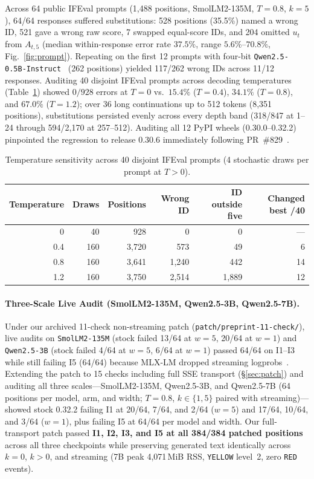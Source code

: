 \documentclass[11pt,letterpaper]{article}
\begin{document}
Across 64 public IFEval prompts (1,488 positions, SmolLM2-135M, $T=0.8$, $k=5$), 64/64 responses suffered substitutions: 528 positions (35.5\%) named a wrong ID, 521 gave a wrong raw score, 7 swapped equal-score IDs, and 204 omitted $u_t$ from $A_{t,5}$ (median within-response error rate $37.5\%$, range $5.6\%$--$70.8\%$, Fig.~\ref{fig:prompt}). Repeating on the first 12 prompts with four-bit \texttt{Qwen2.5-0.5B-Instruct}~\cite{qwen} (262 positions) yielded 117/262 wrong IDs across 11/12 responses. Auditing 40 disjoint IFEval prompts across decoding temperatures (Table~\ref{tab:temperature}) showed $0/928$ errors at $T=0$ vs.\ $15.4\%$ ($T=0.4$), $34.1\%$ ($T=0.8$), and $67.0\%$ ($T=1.2$); over 36 long continuations up to 512 tokens (8,351 positions), substitutions persisted evenly across every depth band (318/847 at 1--24 through 594/2,170 at 257--512). Auditing all 12 PyPI wheels (0.30.0--0.32.2) pinpointed the regression to release 0.30.6 immediately following PR~\#829~\cite{change}.

\begin{table}[t]
\centering
\caption{Temperature sensitivity across 40 disjoint IFEval prompts (4 stochastic draws per prompt at $T>0$).}
\label{tab:temperature}
\footnotesize
\begin{tabular}{@{}rrrrrr@{}}\toprule
Temperature & Draws & Positions & Wrong ID & ID outside five & Changed best /40\\\midrule
0 & 40 & 928 & 0 & 0 & ---\\
0.4 & 160 & 3,720 & 573 & 49 & 6\\
0.8 & 160 & 3,641 & 1,240 & 442 & 14\\
1.2 & 160 & 3,750 & 2,514 & 1,889 & 12\\\bottomrule
\end{tabular}
\end{table}

\paragraph{Three-Scale Live Audit (SmolLM2-135M, Qwen2.5-3B, Qwen2.5-7B).} Under our archived 11-check non-streaming patch (\texttt{patch/preprint-11-check/}), live audits on \texttt{SmolLM2-135M} (stock failed 13/64 at $w=5$, 20/64 at $w=1$) and \texttt{Qwen2.5-3B} (stock failed 4/64 at $w=5$, 6/64 at $w=1$) passed 64/64 on \textsc{I1}--\textsc{I3} while still failing \textsc{I5} (64/64) because MLX-LM dropped streaming logprobs~\cite{mlxstream}. Extending the patch to 15 checks including full SSE transport (\S\ref{sec:patch}) and auditing all three scales---SmolLM2-135M, Qwen2.5-3B, and Qwen2.5-7B (64 positions per model, arm, and width; $T=0.8$, $k\in\{1,5\}$ paired with streaming)---showed stock 0.32.2 failing \textsc{I1} at 20/64, 7/64, and 2/64 ($w=5$) and 17/64, 10/64, and 3/64 ($w=1$), plus failing \textsc{I5} at 64/64 per model and width. Our full-transport patch passed \textbf{I1, I2, I3, and I5 at all 384/384 patched positions} across all three checkpoints while preserving generated text identically across $k=0$, $k>0$, and streaming (7B peak 4,071\,MiB RSS, \texttt{YELLOW} level~2, zero \texttt{RED} events).
\end{document}
